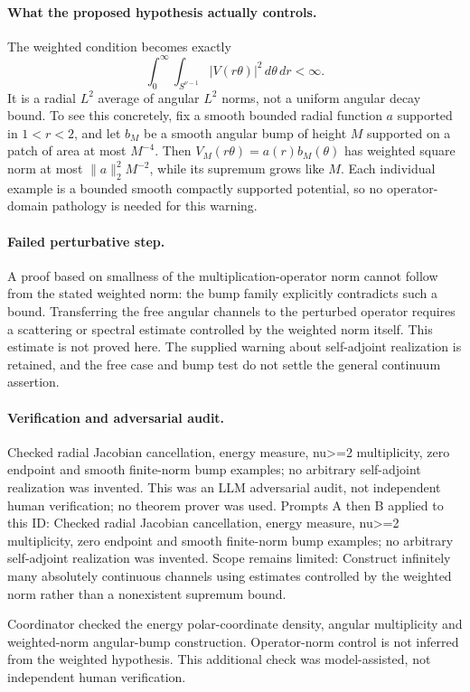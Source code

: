 \documentclass[11pt]{article}
\begin{document}
\paragraph{What the proposed hypothesis actually controls.}The weighted condition becomes exactly
\[\int_0^\infty\int_{S^{\nu-1}}|V(r\theta)|^2\,d\theta\,dr<\infty.\]
It is a radial \(L^2\) average of angular \(L^2\) norms, not a uniform angular decay bound. To see this concretely, fix a smooth bounded radial function \(a\) supported in \(1<r<2\), and let \(b_M\) be a smooth angular bump of height \(M\) supported on a patch of area at most \(M^{-4}\). Then \(V_M(r\theta)=a(r)b_M(\theta)\) has weighted square norm at most \(\|a\|_2^2M^{-2}\), while its supremum grows like \(M\). Each individual example is a bounded smooth compactly supported potential, so no operator-domain pathology is needed for this warning.
\paragraph{Failed perturbative step.}A proof based on smallness of the multiplication-operator norm cannot follow from the stated weighted norm: the bump family explicitly contradicts such a bound. Transferring the free angular channels to the perturbed operator requires a scattering or spectral estimate controlled by the weighted norm itself. This estimate is not proved here. The supplied warning about self-adjoint realization is retained, and the free case and bump test do not settle the general continuum assertion.

\paragraph{Verification and adversarial audit.}
Checked radial Jacobian cancellation, energy measure, nu>=2 multiplicity, zero endpoint and smooth finite-norm bump examples; no arbitrary self-adjoint realization was invented. This was an LLM adversarial audit, not independent human verification; no theorem prover was used. Prompts A then B applied to this ID: Checked radial Jacobian cancellation, energy measure, nu>=2 multiplicity, zero endpoint and smooth finite-norm bump examples; no arbitrary self-adjoint realization was invented. Scope remains limited: Construct infinitely many absolutely continuous channels using estimates controlled by the weighted norm rather than a nonexistent supremum bound.

Coordinator checked the energy polar-coordinate density, angular multiplicity and weighted-norm angular-bump construction. Operator-norm control is not inferred from the weighted hypothesis. This additional check was model-assisted, not independent human verification.
\end{document}
